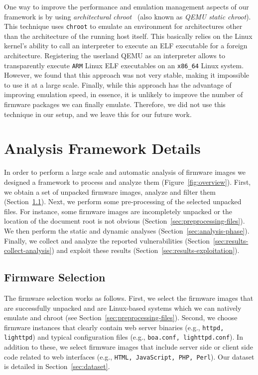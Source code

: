 \documentclass[conference]{./templates/ndss/IEEEtran}
\newcounter{t0d0_counter}
\newcounter{pr00f_counter}
\begin{document}
One way to improve the performance and emulation management aspects of
our framework is by using \emph{architectural
  chroot}~\cite{foot-arch-root} (also known as \emph{QEMU static
  chroot}). This technique uses \texttt{chroot} to emulate an
environment for architectures other than the architecture of the
running host itself. This basically relies on the Linux kernel's
ability to call an interpreter to execute an ELF executable for a
foreign architecture. Registering the userland QEMU as an interpreter
allows to transparently execute \texttt{ARM} Linux ELF executables on
an \texttt{x86\_64} Linux system. However, we found that this approach
was not very stable, making it impossible to use it at a
large scale.  Finally, while this approach has the advantage of
improving emulation speed, in essence, it is unlikely to improve the number of
firmware packages we can finally emulate.  Therefore, we did not
use this technique in our setup, and we leave this for our future work.


\section{Analysis Framework Details}
\label{sec:framework-details}



In order to perform a large scale and automatic analysis of firmware images we
designed a framework to process and analyze them (Figure~\ref{fig:overview}).
First, we obtain a set of unpacked firmware images, analyze and filter them 
(Section~\ref{sec:firmware-selection}). Next, we perform some pre-processing 
of the selected unpacked files. For instance, some firmware images are 
incompletely unpacked or the location of the document root is not obvious 
(Section~\ref{sec:preprocessing-files}). 
We then perform the static and dynamic analyses 
(Section~\ref{sec:analysis-phase}). 
Finally, we collect and analyze the reported vulnerabilities 
(Section~\ref{sec:results-collect-analysis}) and exploit these results 
(Section~\ref{sec:results-exploitation}). 


\subsection{Firmware Selection}
\label{sec:firmware-selection}

The firmware selection works as follows. 
First, we select the firmware images that are successfully unpacked and 
are Linux-based systems which we can natively emulate and chroot
(see Section~\ref{sec:preprocessing-files}). 
Second, we choose firmware instances that clearly contain web server binaries 
(e.g., \texttt{httpd, lighttpd}) and typical configuration files 
(e.g., \texttt{boa.conf, lighttpd.conf}). In addition to these, we 
select firmware images that include server side or client side code related to 
web interfaces (e.g., \texttt{HTML, JavaScript, PHP, Perl}).
Our dataset is detailed in Section~\ref{sec:dataset}.
\end{document}
